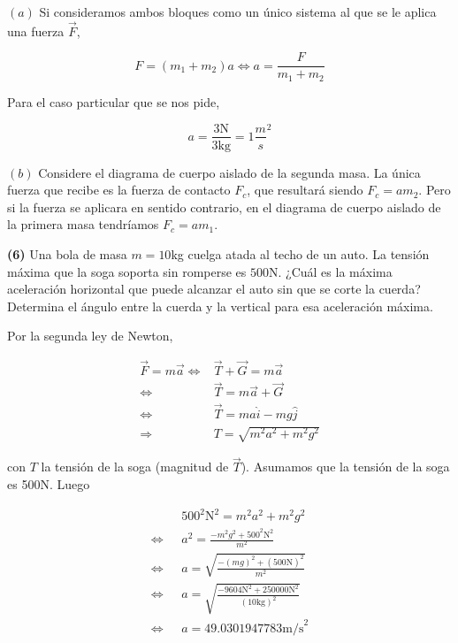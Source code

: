 \documentclass[12pt]{article}
\theoremstyle{definition}
\begin{document}
$(a)$ Si consideramos ambos bloques como un único sistema al que se le aplica
una fuerza $\vec{F}$, 

\begin{equation*}
    F = (m_1 + m_2)a \iff a = \frac{F}{m_1 + m_2}
\end{equation*}

Para el caso particular que se nos pide, 

\begin{equation*}
    a = \frac{3\text{N}}{3\text{kg}} = 1 \frac{m}{s}^2
\end{equation*}

$(b)$ Considere el diagrama de cuerpo aislado de la segunda masa. La única
fuerza que recibe es la fuerza de contacto $F_c$, que resultará siendo $F_c = a
m_2$. Pero si la fuerza se aplicara en sentido contrario, en el diagrama de
cuerpo aislado de la primera masa tendríamos $F_c = am_1$.

\pagebreak 

\begin{shaded}
    \textbf{(6)} Una bola de masa $m=\text{10}$kg cuelga atada al techo de un
    auto. La tensión máxima que la soga soporta sin romperse es $500$N. ¿Cuál es
    la máxima aceleración horizontal que puede alcanzar el auto sin que se corte
    la cuerda? Determina el ángulo entre la cuerda y la vertical para esa
    aceleración máxima.
\end{shaded}

Por la segunda ley de Newton,

\begin{align*}
    \vec{F} = m\vec{a} 
    \iff 
    &\vec{T} + \vec{G} = m \vec{a} \\
    \iff &\vec{T} =
    m\vec{a} + \vec{G}\\ 
    \iff &\vec{T} = ma \hat{i} - mg \hat{j}\\ 
    \Rightarrow &T = \sqrt{m^2a^2 + m^2g^2} 
\end{align*}

con $T$ la tensión de la soga (magnitud de $\vec{T}$). Asumamos que la tensión
de la soga es 500N. Luego

\begin{align*}
    &500^2\text{N}^2 = m^2a^2 + m^2g^2\\ 
    \iff ~ ~ ~ 
    &a^2 = \frac{ -m^2g^2 + 500^2\text{N}^2 }{m^2}\\ 
    \iff ~ ~ ~ 
    &a = \sqrt{ \frac{ -( mg )^2 + ( 500\text{N} )^2 }{m^2} } \\ 
    \iff ~ ~ ~ 
    & a = \sqrt{ \frac{  -9604\text{N}^2 + 250000\text{N}^2  }{ (10\text{kg})^2
    }}\\
    \iff ~ ~ ~ 
    &a = 49.0301947783\text{m/s}^2
\end{align*}
\end{document}
